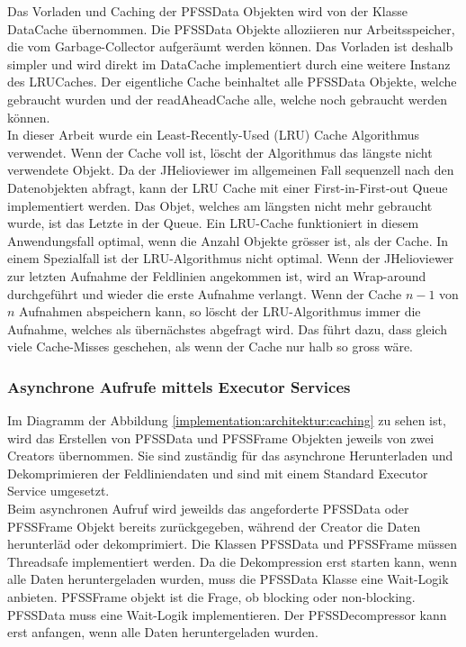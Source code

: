 Das Vorladen und Caching der PFSSData Objekten wird von der Klasse DataCache übernommen. Die PFSSData Objekte alloziieren nur Arbeitsspeicher, die vom Garbage-Collector aufgeräumt werden können. Das Vorladen ist deshalb simpler und wird direkt im DataCache implementiert durch eine weitere Instanz des LRUCaches. Der eigentliche Cache beinhaltet alle PFSSData Objekte, welche gebraucht wurden und der readAheadCache alle, welche noch gebraucht werden können.\\
[\baselineskip] 
In dieser Arbeit wurde ein Least-Recently-Used (LRU) Cache Algorithmus verwendet. Wenn der Cache voll ist, löscht der Algorithmus das längste nicht verwendete Objekt. Da der JHelioviewer im allgemeinen Fall sequenzell nach den Datenobjekten abfragt, kann der LRU Cache mit einer First-in-First-out Queue implementiert werden. Das Objet, welches am längsten nicht mehr gebraucht wurde, ist das Letzte in der Queue. Ein LRU-Cache funktioniert in diesem Anwendungsfall optimal, wenn die Anzahl Objekte grösser ist, als der Cache. In einem Spezialfall ist der LRU-Algorithmus nicht optimal. Wenn der JHelioviewer zur letzten Aufnahme der Feldlinien angekommen ist, wird an Wrap-around durchgeführt und wieder die erste Aufnahme verlangt. Wenn der Cache $n-1$ von $n$ Aufnahmen abspeichern kann, so löscht der LRU-Algorithmus immer die Aufnahme, welches als übernächstes abgefragt wird. Das führt dazu, dass gleich viele Cache-Misses geschehen, als wenn der Cache nur halb so gross wäre.

\subsubsection{Asynchrone Aufrufe mittels Executor Services}
Im Diagramm der Abbildung \ref{implementation:architektur:caching} zu sehen ist, wird das Erstellen von PFSSData und PFSSFrame Objekten jeweils von zwei Creators übernommen. Sie sind zuständig für das asynchrone Herunterladen und Dekomprimieren der Feldliniendaten und sind mit einem Standard Executor Service umgesetzt.\\
Beim asynchronen Aufruf wird jeweilds das angeforderte PFSSData oder PFSSFrame Objekt bereits zurückgegeben, während der Creator die Daten herunterläd oder dekomprimiert. Die Klassen PFSSData und PFSSFrame müssen Threadsafe implementiert werden. Da die Dekompression erst starten kann, wenn alle Daten heruntergeladen wurden, muss die PFSSData Klasse eine Wait-Logik anbieten.
 PFSSFrame objekt ist die Frage, ob blocking oder non-blocking.
PFSSData muss eine Wait-Logik implementieren. Der PFSSDecompressor kann erst anfangen, wenn alle Daten heruntergeladen wurden.
